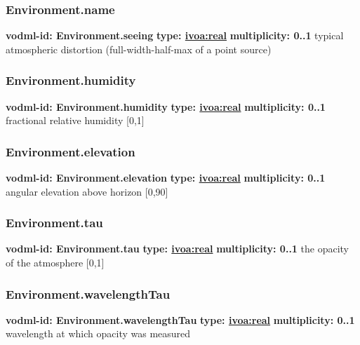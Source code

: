     \subsubsection{Environment.name}
      \textbf{vodml-id: Environment.seeing} \newline
      \textbf{type: \hyperref[sect:ivoa]{ivoa:real}} \newline
      \textbf{multiplicity: 0..1} \newline
      typical atmospheric distortion (full-width-half-max of a point source)

    \subsubsection{Environment.humidity}
      \textbf{vodml-id: Environment.humidity} \newline
      \textbf{type: \hyperref[sect:ivoa]{ivoa:real}} \newline
      \textbf{multiplicity: 0..1} \newline
      fractional relative humidity [0,1]

    \subsubsection{Environment.elevation}
      \textbf{vodml-id: Environment.elevation} \newline
      \textbf{type: \hyperref[sect:ivoa]{ivoa:real}} \newline
      \textbf{multiplicity: 0..1} \newline
      angular elevation above horizon [0,90]

    \subsubsection{Environment.tau}
      \textbf{vodml-id: Environment.tau} \newline
      \textbf{type: \hyperref[sect:ivoa]{ivoa:real}} \newline
      \textbf{multiplicity: 0..1} \newline
      the opacity of the atmosphere [0,1]

    \subsubsection{Environment.wavelengthTau}
      \textbf{vodml-id: Environment.wavelengthTau} \newline
      \textbf{type: \hyperref[sect:ivoa]{ivoa:real}} \newline
      \textbf{multiplicity: 0..1} \newline
      wavelength at which opacity was measured

